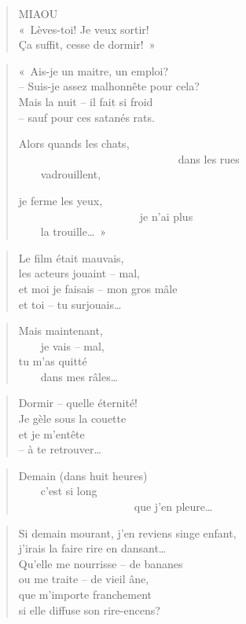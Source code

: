   \begin{verse}
    MIAOU\\
    «~Lèves-toi! Je veux sortir!\\
    Ça suffit, cesse de dormir!~»
  \end{verse}
  \begin{verse}
    «~Ais-je un maitre, un emploi?\\
    -- Suis-je assez malhonnête pour cela?\\
    Mais la nuit -- il fait si froid\\
    -- sauf pour ces satanés rats.
    
    Alors quands les chats,\\
    ~~~~~~~~~~~~~~~~~~~~~~~~~~~~~dans les rues\\
    ~~~~vadrouillent,
    
    je ferme les yeux,\\
    ~~~~~~~~~~~~~~~~~~~~~~je n’ai plus\\
    ~~~~la trouille…~»
  \end{verse}
  \begin{verse}
    Le film était mauvais,\\
    les acteurs jouaint -- mal,\\
    et moi je faisais -- mon gros mâle\\
    et toi -- tu surjouais…
  \end{verse}
  \begin{verse}
    Mais maintenant,\\
    ~~~~je vais -- mal,\\
    tu m’as quitté\\
    ~~~~dans mes râles…
  \end{verse}
  \begin{verse}
    Dormir -- quelle éternité!\\
    Je gèle sous la couette\\
    et je m’entête\\
    -- à te retrouver…
  \end{verse}
  \begin{verse}
    Demain (dans huit heures)\\
    ~~~~c’est si long\\
    ~~~~~~~~~~~~~~~~~~~~~que j’en pleure…
  \end{verse}
  \begin{verse}
    Si demain mourant, j’en reviens singe enfant,\\
    j’irais la faire rire en dansant…\\
    Qu’elle me nourrisse -- de bananes\\
    ou me traite -- de vieil âne,\\
    que m’importe franchement\\
    si elle diffuse son rire-encens?
  \end{verse}
